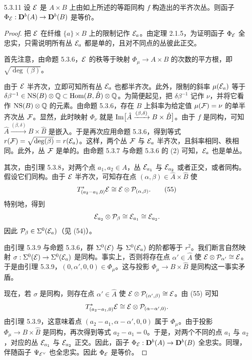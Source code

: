 \begin{proposition}{5.3.11}
设 $\mathcal{E}$ 是 $A\times B$ 上由如上所述的等距同构 $f$ 构造出的半齐次丛。则函子 $\Phi_{\mathcal{E}}:\mathbf{D}^{b}(A)\to\mathbf{D}^{b}(B)$ 是等价。
\end{proposition}

\begin{proof}
把 $\mathcal{E}$ 在纤维 $\{a\}\times B$ 上的限制记作 $\mathcal{E}_a$。由定理 2.1.5，为证明函子 $\Phi_{\mathcal{E}}$ 全忠实，只需说明所有丛 $\mathcal{E}_a$ 都是单的，且对不同点的丛彼此正交。

首先注意，由命题 5.3.6，$\mathcal{E}$ 的秩等于映射 $\Phi_\mu\to A\times B$ 的次数的平方根，即 $\sqrt{\deg(\beta)}$。

由于 $\mathcal{E}$ 半齐次，立即可知所有丛 $\mathcal{E}_a$ 也都半齐次。此外，限制的斜率 $\mu(\mathcal{E}_a)$ 等于 $\delta\beta^{-1}\in\mathrm{NS}(B)\otimes\mathbb{Q}\subset\operatorname{Hom}(B,\hat B)\otimes\mathbb{Q}$。为简便起见，把 $\delta\beta^{-1}$ 记作 $\nu$，并将它看作 $\mathrm{NS}(B)\otimes\mathbb{Q}$ 的元素。由命题 5.3.6，存在 $B$ 上斜率为给定值 $\mu(\mathcal{F})=\nu$ 的单半齐次丛 $\mathcal{F}$。显然，此时映射 $\Phi_\nu$ 就是 $\operatorname{Im}\bigl[\hat A\xrightarrow{(\beta,\delta)}B\times\hat B\bigr]$。由于 $f$ 是同构，可知 $\hat A\xrightarrow{(\beta,\delta)}B\times\hat B$ 是嵌入。于是再次应用命题 5.3.6，得到等式 $r(\mathcal{F})=\sqrt{\deg(\beta)}=r(\mathcal{E}_a)$。这样，两个丛 $\mathcal{F}$ 与 $\mathcal{E}_a$ 半齐次，且斜率相同、秩相同。此外，丛 $\mathcal{F}$ 是单的。由命题 5.3.7 与命题 5.3.6 的 (2) 可知，$\mathcal{E}_a$ 也是单丛。

其次，由引理 5.3.8，对两个点 $a_1,a_2\in A$，丛 $\mathcal{E}_{a_1}$ 与 $\mathcal{E}_{a_2}$ 或者正交，或者同构。假设它们同构。由于 $\mathcal{E}$ 半齐次，可知存在点 $(\alpha,\beta)\in\hat A\times\hat B$ 使
\begin{equation}
T^*_{(a_2-a_1,0)}\mathcal{E}\cong\mathcal{E}\otimes\mathcal{P}_{(\alpha,\beta)}.\tag{55}
\end{equation}
特别地，得到
\begin{equation*}
\mathcal{E}_{a_2}\otimes\mathcal{P}_\beta\cong\mathcal{E}_{a_1}\cong\mathcal{E}_{a_2}.
\end{equation*}
因此 $\mathcal{P}_\beta\in\Sigma^0(\mathcal{E}_a)$（见 (54)）。

由引理 5.3.9 与命题 5.3.6，群 $\Sigma^0(\mathcal{E})$ 与 $\Sigma^0(\mathcal{E}_a)$ 的阶都等于 $r^2$。我们断言自然映射 $\sigma:\Sigma^0(\mathcal{E})\to\Sigma^0(\mathcal{E}_a)$ 是同构。事实上，否则将存在点 $\alpha'\in\hat A$ 使 $\mathcal{E}\otimes\mathcal{P}_{\alpha'}\cong\mathcal{E}$。于是由引理 5.3.9，$(0,\alpha',0,0)\in\Phi_\mu$。这与投影 $\Phi_\mu\to B\times\hat B$ 是同构这一事实矛盾。

现在，若 $\sigma$ 是同构，则存在点 $\alpha'\in\hat A$ 使 $\mathcal{E}\otimes\mathcal{P}_{(\alpha',\beta)}\cong\mathcal{E}$。由 (55) 可知
\begin{equation*}
T^*_{(a_2-a_1,0)}\mathcal{E}\cong\mathcal{E}\otimes\mathcal{P}_{(\alpha-\alpha',0)}.
\end{equation*}
由引理 5.3.9，这意味着点 $(a_2-a_1,\alpha-\alpha',0,0)$ 属于 $\Phi_\mu$。由于投影 $\Phi_\mu\to B\times\hat B$ 是同构，再次得到等式 $a_2-a_1=0$。于是，对两个不同的点 $a_1$ 与 $a_2$，对应的丛 $\mathcal{E}_{a_1}$ 与 $\mathcal{E}_{a_2}$ 正交。因此，函子 $\Phi_{\mathcal{E}}:\mathbf{D}^{b}(A)\to\mathbf{D}^{b}(B)$ 全忠实。同理，伴随函子 $\Psi_{\mathcal{E}^\vee}$ 也全忠实。因此 $\Phi_{\mathcal{E}}$ 是等价。
\end{proof}

